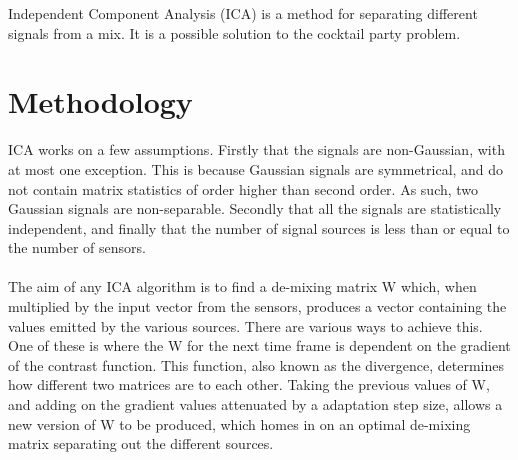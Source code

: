 \label{appendix:ica}
Independent Component Analysis (ICA) is a method for separating different signals from a mix.
It is a possible solution to the cocktail party problem.

\section{Methodology}

ICA works on a few assumptions.
Firstly that the signals are non-Gaussian, with at most one exception.
This is because Gaussian signals are symmetrical, and do not contain matrix statistics of order higher than second order.
As such, two Gaussian signals are non-separable.
Secondly that all the signals are statistically independent, and finally that the number of signal sources is less than or equal to the number of sensors.
\\
\\
The aim of any ICA algorithm is to find a de-mixing matrix W which, when multiplied by the input vector from the sensors, produces a vector containing the values emitted by the various sources.
There are various ways to achieve this.
One of these is where the W for the next time frame is dependent on the gradient of the contrast function.
This function, also known as the divergence, determines how different two matrices are to each other.
Taking the previous values of W, and adding on the gradient values attenuated by a adaptation step size, allows a new version of W to be produced, which homes in on an optimal de-mixing matrix separating out the different sources.

